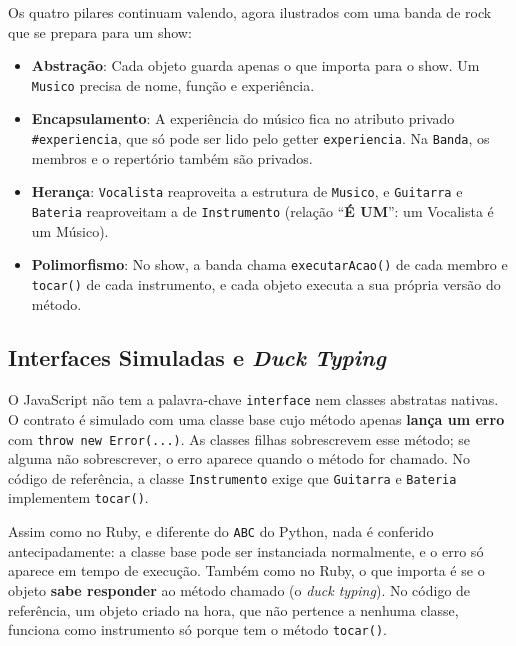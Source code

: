 Os quatro pilares continuam valendo, agora ilustrados com uma banda de rock que se prepara para
um show:

\begin{itemize}
    \item \textbf{Abstração}: Cada objeto guarda apenas o que importa para o show. Um
    \texttt{Musico} precisa de nome, função e experiência.

    \item \textbf{Encapsulamento}: A experiência do músico fica no atributo privado
    \texttt{\#experiencia}, que só pode ser lido pelo getter \texttt{experiencia}. Na
    \texttt{Banda}, os membros e o repertório também são privados.

    \item \textbf{Herança}: \texttt{Vocalista} reaproveita a estrutura de \texttt{Musico}, e
    \texttt{Guitarra} e \texttt{Bateria} reaproveitam a de \texttt{Instrumento} (relação
    ``\textbf{É UM}'': um Vocalista é um Músico).

    \item \textbf{Polimorfismo}: No show, a banda chama \texttt{executarAcao()} de cada membro e
    \texttt{tocar()} de cada instrumento, e cada objeto executa a sua própria versão do método.
\end{itemize}

\subsection{Interfaces Simuladas e \textit{Duck Typing}}

O JavaScript não tem a palavra-chave \texttt{interface} nem classes abstratas nativas. O
contrato é simulado com uma classe base cujo método apenas \textbf{lança um erro} com
\texttt{throw new Error(...)}. As classes filhas sobrescrevem esse método; se alguma não
sobrescrever, o erro aparece quando o método for chamado. No código de referência, a classe
\texttt{Instrumento} exige que \texttt{Guitarra} e \texttt{Bateria} implementem
\texttt{tocar()}.

Assim como no Ruby, e diferente do \texttt{ABC} do Python, nada é conferido antecipadamente: a
classe base pode ser instanciada normalmente, e o erro só aparece em tempo de execução. Também
como no Ruby, o que importa é se o objeto \textbf{sabe responder} ao método chamado (o
\textit{duck typing}). No código de referência, um objeto criado na hora, que não pertence a
nenhuma classe, funciona como instrumento só porque tem o método \texttt{tocar()}.

